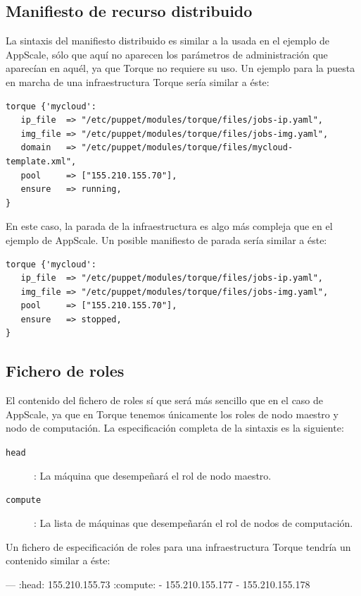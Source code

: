 \subsection{Manifiesto de recurso distribuido}

La sintaxis del manifiesto distribuido es similar a la usada en el ejemplo de AppScale, sólo que aquí no aparecen los parámetros de administración que aparecían en aquél, ya que Torque no requiere su uso. Un ejemplo para la puesta en marcha de una infraestructura Torque sería similar a éste:

\begin{lstlisting}
torque {'mycloud':
   ip_file  => "/etc/puppet/modules/torque/files/jobs-ip.yaml",
   img_file => "/etc/puppet/modules/torque/files/jobs-img.yaml",
   domain   => "/etc/puppet/modules/torque/files/mycloud-template.xml",
   pool     => ["155.210.155.70"],
   ensure   => running,
}
\end{lstlisting}

En este caso, la parada de la infraestructura es algo más compleja que en el ejemplo de AppScale. Un posible manifiesto de parada sería similar a éste:

\begin{lstlisting}
torque {'mycloud':
   ip_file  => "/etc/puppet/modules/torque/files/jobs-ip.yaml",
   img_file => "/etc/puppet/modules/torque/files/jobs-img.yaml",
   pool     => ["155.210.155.70"],
   ensure   => stopped,
}
\end{lstlisting}

\subsection{Fichero de roles}

El contenido del fichero de roles sí que será más sencillo que en el caso de AppScale, ya que en Torque tenemos únicamente los roles de nodo maestro y nodo de computación. La especificación completa de la sintaxis es la siguiente:

\begin{description}
\item[\texttt{head}]: La máquina que desempeñará el rol de nodo maestro.
\item[\texttt{compute}]: La lista de máquinas que desempeñarán el rol de nodos de computación.
\end{description}

Un fichero de especificación de roles para una infraestructura Torque tendría un contenido similar a éste:
\begin{yamlcode}
--- 
:head: 155.210.155.73
:compute:
- 155.210.155.177
- 155.210.155.178
\end{yamlcode}



